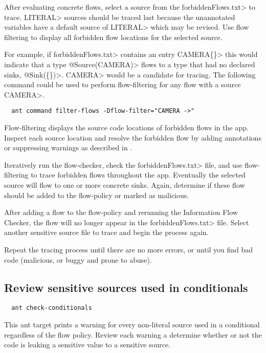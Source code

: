 After evaluating concrete flows, select a source from the \<forbiddenFlows.txt> to trace.
\<LITERAL> sources should be traced last because the unannotated variables have
a default source of \<LITERAL> which may be revised. Use flow filtering to display
all forbidden flow locations for the selected source.

For example, if \<forbiddenFlows.txt> contains an entry \<CAMERA\flowsto \{\}>
this would indicate that a type \<@Source(CAMERA)> flows to a type that had no declared sinks,
\<@Sink(\{\})>. \<CAMERA> would be a candidate for tracing. The following command
could be used to perform flow-filtering for any flow with a source \<CAMERA>.

\begin{Verbatim}
  ant command filter-flows -Dflow-filter="CAMERA ->"
\end{Verbatim}

Flow-filtering displays the source code locations of forbidden flows in the app.
Inspect each source location and resolve the forbidden flow by adding annotations
or suppressing warnings as described in .

Iteratively run the flow-checker, check the \<forbiddenFlows.txt> file, and use flow-filtering
to trace forbidden flows throughout the app.  Eventually the selected source will flow
to one or more concrete sinks. Again, determine if these flow should be added to the flow-policy
or marked as malicious.

After adding a flow to the flow-policy and rerunning the Information Flow Checker, the flow
will no longer appear in the \<forbiddenFlows.txt> file. Select another sensitive
source file to trace and begin the process again.

Repeat the tracing process until there are no more errors, or until you find bad code
(malicious, or buggy and prone to abuse).

\subsection{Review sensitive sources used in conditionals}
\begin{Verbatim}
  ant check-conditionals
\end{Verbatim}
This ant target prints a warning for every non-literal source used in a conditional regardless
of the flow policy.  Review each warning a determine whether or not the code is leaking a 
sensitive value to a sensitive source. 

